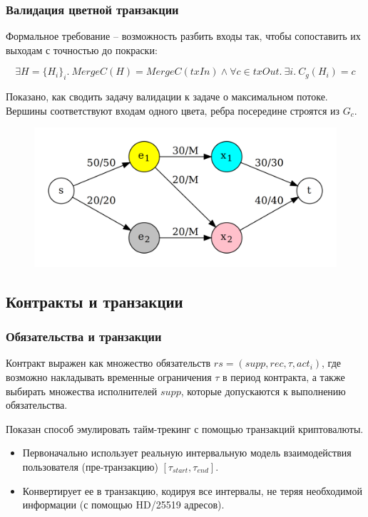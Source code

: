 \documentclass[11pt,handout,pdf,hyperref={unicode}]{beamer}
\begin{document}
\begin{frame}
  \frametitle{Валидация цветной транзакции}

  Формальное требование -- возможность разбить входы так, чтобы
  сопоставить их выходам с точностью до покраски:

  \[
  \exists H = \{H_i\}_i. \ MergeC(H) = MergeC(txIn) \wedge \forall c \in txOut . \ \exists i . \ C_g(H_i) = c
  \]


  Показано, как сводить задачу валидации к задаче о максимальном
  потоке. Вершины соответствуют входам одного цвета, ребра посередине
  строятся из $G_c$.

  \begin{figure}[t]
  \includegraphics[scale=0.12]{pres_colortx_graph}
  \centering
  \end{figure}
\end{frame}

\subsection{Контракты и транзакции}

\begin{frame}
  \frametitle{Обязательства и транзакции} Контракт выражен как
  множество обязательств $rs = (supp, rec, \tau, act_i)$, где возможно
  накладывать временные ограничения $\tau$ в период контракта, а также
  выбирать множества исполнителей $supp$, которые допускаются к
  выполнению обязательства.

  Показан способ эмулировать тайм-трекинг с помощью транзакций криптовалюты.
  \begin{itemize}
  \item Первоначально использует реальную интервальную модель
    взаимодействия пользователя (пре-транзакцию) $[\tau_{start}, \tau_{end}]$.
  \item Конвертирует ее в транзакцию, кодируя все интервалы, не теряя
    необходимой информации (с помощью HD/25519 адресов).
  \end{itemize}
\end{frame}
\end{document}
